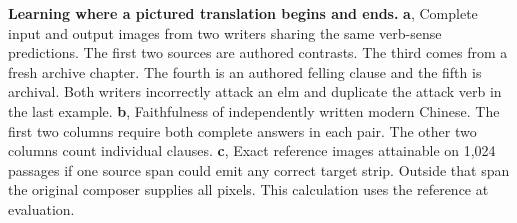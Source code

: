\textbf{Learning where a pictured translation begins and ends.} \textbf{a}, Complete input and output images from two writers sharing the same verb-sense predictions. The first two sources are authored contrasts. The third comes from a fresh archive chapter. The fourth is an authored felling clause and the fifth is archival. Both writers incorrectly attack an elm and duplicate the attack verb in the last example. \textbf{b}, Faithfulness of independently written modern Chinese. The first two columns require both complete answers in each pair. The other two columns count individual clauses. \textbf{c}, Exact reference images attainable on 1,024 passages if one source span could emit any correct target strip. Outside that span the original composer supplies all pixels. This calculation uses the reference at evaluation.

